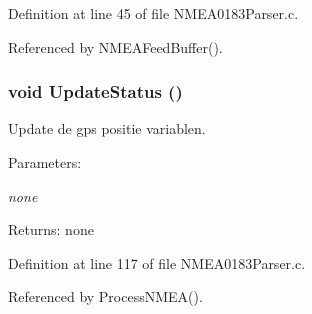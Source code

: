 Definition at line 45 of file NMEA0183Parser.c.

Referenced by NMEAFeedBuffer().
\subsubsection{\setlength{\rightskip}{0pt plus 5cm}void UpdateStatus ()}\label{_n_m_e_a0183_parser_8c_c945854d98af9a04ad3bdcfa4048394f}


Update de gps positie variablen. 

\begin{Desc}
\item[Parameters:]
\begin{description}
\item[{\em none}]\end{description}
\end{Desc}
\begin{Desc}
\item[Returns:]none \end{Desc}


Definition at line 117 of file NMEA0183Parser.c.

Referenced by ProcessNMEA().